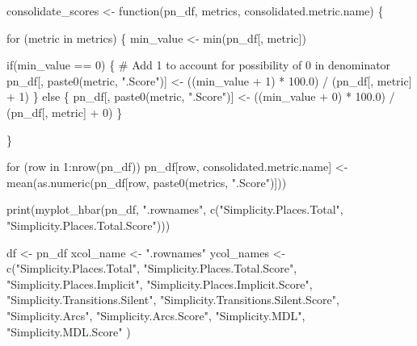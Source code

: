 \documentclass[]{article}
\newenvironment{Shaded}{\begin{snugshade}}{\end{snugshade}}
\newcommand{\KeywordTok}[1]{\textcolor[rgb]{0.94,0.87,0.69}{{#1}}}
\newcommand{\DecValTok}[1]{\textcolor[rgb]{0.86,0.86,0.80}{{#1}}}
\newcommand{\FloatTok}[1]{\textcolor[rgb]{0.75,0.75,0.82}{{#1}}}
\newcommand{\StringTok}[1]{\textcolor[rgb]{0.80,0.58,0.58}{{#1}}}
\newcommand{\CommentTok}[1]{\textcolor[rgb]{0.50,0.62,0.50}{{#1}}}
\newcommand{\NormalTok}[1]{\textcolor[rgb]{0.80,0.80,0.80}{{#1}}}
\begin{document}
\begin{Shaded}
\begin{Highlighting}[]
\NormalTok{consolidate_scores <-}\StringTok{ }\NormalTok{function(pn_df, metrics, consolidated.metric.name) \{}
    
    \NormalTok{for (metric in metrics) \{}
        \NormalTok{min_value <-}\StringTok{ }\KeywordTok{min}\NormalTok{(pn_df[, metric])}
        
        \NormalTok{if(min_value ==}\StringTok{ }\DecValTok{0}\NormalTok{) \{}
            \CommentTok{# Add 1 to account for possibility of 0 in denominator}
            \NormalTok{pn_df[, }\KeywordTok{paste0}\NormalTok{(metric, }\StringTok{".Score"}\NormalTok{)] <-}\StringTok{ }
\StringTok{                }\NormalTok{((min_value +}\StringTok{ }\DecValTok{1}\NormalTok{) *}\StringTok{ }\FloatTok{100.0}\NormalTok{) /}\StringTok{ }\NormalTok{(pn_df[, metric] +}\StringTok{ }\DecValTok{1}\NormalTok{)}
        \NormalTok{\} else \{}
            \NormalTok{pn_df[, }\KeywordTok{paste0}\NormalTok{(metric, }\StringTok{".Score"}\NormalTok{)] <-}\StringTok{ }
\StringTok{                }\NormalTok{((min_value +}\StringTok{ }\DecValTok{0}\NormalTok{) *}\StringTok{ }\FloatTok{100.0}\NormalTok{) /}\StringTok{ }\NormalTok{(pn_df[, metric] +}\StringTok{ }\DecValTok{0}\NormalTok{)}
        \NormalTok{\}}
            
    \NormalTok{\}}
    
    \NormalTok{for (row in }\DecValTok{1}\NormalTok{:}\KeywordTok{nrow}\NormalTok{(pn_df))}
        \NormalTok{pn_df[row, consolidated.metric.name] <-}\StringTok{ }
\StringTok{            }\KeywordTok{mean}\NormalTok{(}\KeywordTok{as.numeric}\NormalTok{(pn_df[row, }\KeywordTok{paste0}\NormalTok{(metrics, }\StringTok{".Score"}\NormalTok{)]))}

    \KeywordTok{print}\NormalTok{(}\KeywordTok{myplot_hbar}\NormalTok{(pn_df, }\StringTok{".rownames"}\NormalTok{, }
                      \KeywordTok{c}\NormalTok{(}\StringTok{"Simplicity.Places.Total"}\NormalTok{, }\StringTok{"Simplicity.Places.Total.Score"}\NormalTok{)))}
    
    \NormalTok{df <-}\StringTok{ }\NormalTok{pn_df}
    \NormalTok{xcol_name <-}\StringTok{ ".rownames"}
    \NormalTok{ycol_names <-}\StringTok{ }\KeywordTok{c}\NormalTok{(}\StringTok{"Simplicity.Places.Total"}\NormalTok{, }\StringTok{"Simplicity.Places.Total.Score"}\NormalTok{,}
                    \StringTok{"Simplicity.Places.Implicit"}\NormalTok{, }\StringTok{"Simplicity.Places.Implicit.Score"}\NormalTok{,}
                    \StringTok{"Simplicity.Transitions.Silent"}\NormalTok{, }\StringTok{"Simplicity.Transitions.Silent.Score"}\NormalTok{,}
                    \StringTok{"Simplicity.Arcs"}\NormalTok{, }\StringTok{"Simplicity.Arcs.Score"}\NormalTok{,}
                    \StringTok{"Simplicity.MDL"}\NormalTok{, }\StringTok{"Simplicity.MDL.Score"}
                    \NormalTok{)}
    

\end{Highlighting}
\end{Shaded}
\end{document}
